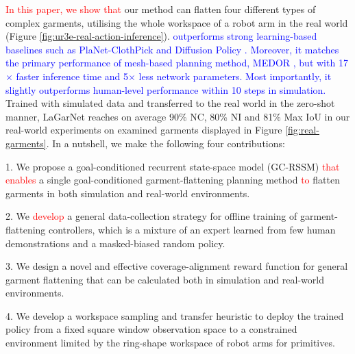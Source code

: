 \documentclass[journal]{IEEEtran}
\newcommand{\addadvantage}[1]{\textcolor{blue}{#1}}
\newcommand{\addinfo}[1]{\textcolor{myPurple}{#1}}
\newcommand{\addtypo}[1]{\textcolor{red}{#1}}
\begin{document}

\addtypo{In this paper, we show that} our method  can flatten four different types of complex garments, utilising the whole workspace of a robot arm in the real world (Figure \ref{fig:ur3e-real-action-inference}).  \addadvantage{outperforms strong learning-based baselines such as PlaNet-ClothPick \cite{kadi2024planet} and Diffusion Policy \cite{chi2023diffusionpolicy}.  Moreover, it  matches the primary performance of mesh-based planning method, MEDOR \cite{huang2022mesh}, but with 17$\times$ faster inference time and 5$\times$ less network parameters. Most importantly, it slightly outperforms human-level performance within 10 steps in simulation.} \addinfo{Trained with simulated data and transferred to the real world in the zero-shot manner,} LaGarNet reaches on average 90\% NC, 80\% NI and 81\% Max IoU in our real-world experiments on examined garments displayed in Figure \ref{fig:real-garments}. In a nutshell, we make the following four contributions:

1. We propose a goal-conditioned recurrent state-space model (GC-RSSM) \addtypo{that enables} a single goal-conditioned garment-flattening planning method  \addtypo{to} flatten garments in both simulation and real-world environments.

2. We \addtypo{develop} a general data-collection strategy for offline training of  garment-flattening controllers, which is a mixture of an expert  learned from few human demonstrations and a masked-biased random policy.

3. We design a novel and effective coverage-alignment reward function for general garment flattening that can be calculated both in simulation and real-world environments.

4. We develop a workspace sampling and transfer heuristic to deploy the trained policy from a fixed square window observation space to a constrained environment limited by the  ring-shape workspace of robot arms for  primitives.

\end{document}
